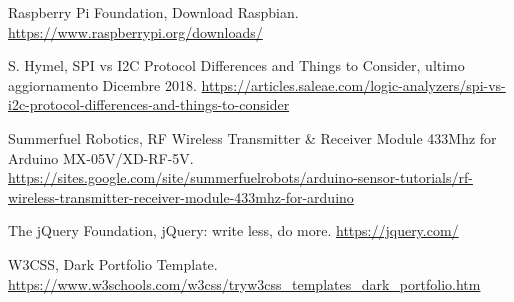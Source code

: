 \documentclass[12pt]{report}
\begin{document}
\begin{thebibliography}{00}
%
Raspberry Pi Foundation, Download Raspbian.
\url{https://www.raspberrypi.org/downloads/}
%

%
S. Hymel, SPI vs I2C Protocol Differences and Things to Consider, ultimo aggiornamento Dicembre 2018.
\url{https://articles.saleae.com/logic-analyzers/spi-vs-i2c-protocol-differences-and-things-to-consider}
%

%
Summerfuel Robotics, RF Wireless Transmitter \& Receiver Module 433Mhz for Arduino MX-05V/XD-RF-5V.
\url{https://sites.google.com/site/summerfuelrobots/arduino-sensor-tutorials/rf-wireless-transmitter-receiver-module-433mhz-for-arduino}
%

%
The jQuery Foundation, jQuery: write less, do more.
\url{https://jquery.com/}
%

%
W3CSS, Dark Portfolio Template.
\url{https://www.w3schools.com/w3css/tryw3css_templates_dark_portfolio.htm}
%

%
\end{thebibliography}
%
\end{document}
